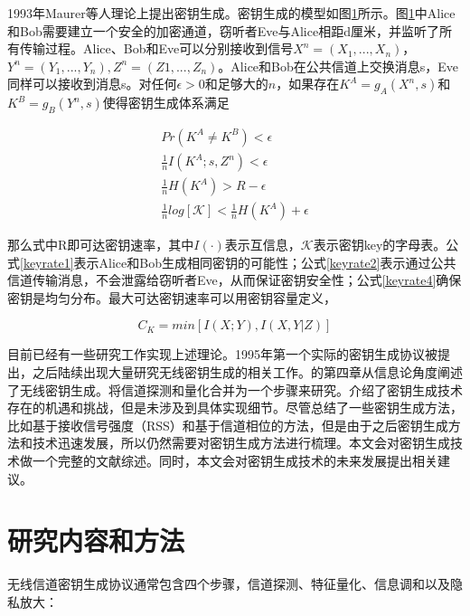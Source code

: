 \documentclass[master]{seuthesis} %
\begin{document}
\begin{Main}
1993年Maurer等人理论上提出密钥生成\cite{ahlswede1993common}\cite{maurer1993secret}。密钥生成的模型如图\ref{}所示。图\ref{}中Alice和Bob需要建立一个安全的加密通道，窃听者Eve与Alice相距d厘米，并监听了所有传输过程。Alice、Bob和Eve可以分别接收到信号$X^n = (X_1, ..., X_n)$，$Y^n = (Y_1, ..., Y_n), Z^n = (Z1, ..., Z_n)$。Alice和Bob在公共信道上交换消息s，Eve同样可以接收到消息s。对任何$\epsilon > 0$和足够大的$n$，如果存在$K^A = g_A(X^n, s)$和$K^B = g_B(Y^n, s)$使得密钥生成体系满足

\begin{eqnarray}
    Pr(K^A \neq K^B) < \epsilon \label{keyrate1} \\
    \frac{1}{n}I(K^A; s, Z^n) < \epsilon \label{keyrate2} \\
    \frac{1}{n}H(K^A) > R - \epsilon \label{keyrate3} \\
    \frac{1}{n}log[\mathcal{K}] < \frac{1}{n}H(K^A) + \epsilon \label{keyrate4}
\end{eqnarray}

那么式中R即可达密钥速率，其中$I(\cdot)$表示互信息，$\mathcal{K}$表示密钥key的字母表。公式\ref{keyrate1}表示Alice和Bob生成相同密钥的可能性；公式\ref{keyrate2}表示通过公共信道传输消息，不会泄露给窃听者Eve，从而保证密钥安全性；公式\ref{keyrate4}确保密钥是均匀分布。最大可达密钥速率可以用密钥容量定义，

\begin{equation}
    C_K = min[I(X;Y), I(X, Y|Z)]
\end{equation}

目前已经有一些研究工作实现上述理论。1995年第一个实际的密钥生成协议被提出\cite{hershey1995unconventional}，之后陆续出现大量研究无线密钥生成的相关工作。\citet{WangSurvey}的第四章从信息论角度阐述了无线密钥生成。\citet{WangSurvey}将信道探测和量化合并为一个步骤来研究。\citet{zeng2015physical}介绍了密钥生成技术存在的机遇和挑战，但是未涉及到具体实现细节。尽管\citet{ren2011secret}总结了一些密钥生成方法，比如基于接收信号强度（RSS）和基于信道相位的方法，但是由于之后密钥生成方法和技术迅速发展，所以仍然需要对密钥生成方法进行梳理。本文会对密钥生成技术做一个完整的文献综述。同时，本文会对密钥生成技术的未来发展提出相关建议。

\section{研究内容和方法}

无线信道密钥生成协议通常包含四个步骤，信道探测、特征量化、信息调和以及隐私放大：


\end{Main}
\end{document}
